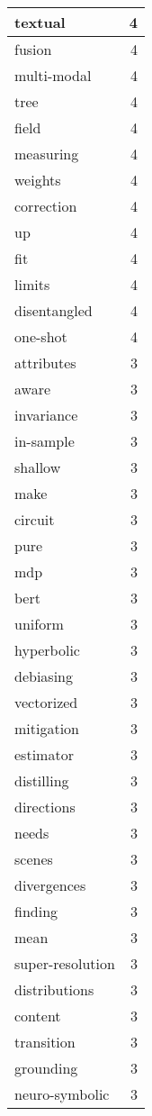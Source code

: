 \begin{table}[h]
\begin{tabular}{|l|r|}
\hline
textual & 4 \\
\hline
fusion & 4 \\
\hline
multi-modal & 4 \\
\hline
tree & 4 \\
\hline
field & 4 \\
\hline
measuring & 4 \\
\hline
weights & 4 \\
\hline
correction & 4 \\
\hline
up & 4 \\
\hline
fit & 4 \\
\hline
limits & 4 \\
\hline
disentangled & 4 \\
\hline
one-shot & 4 \\
\hline
attributes & 3 \\
\hline
aware & 3 \\
\hline
invariance & 3 \\
\hline
in-sample & 3 \\
\hline
shallow & 3 \\
\hline
make & 3 \\
\hline
circuit & 3 \\
\hline
pure & 3 \\
\hline
mdp & 3 \\
\hline
bert & 3 \\
\hline
uniform & 3 \\
\hline
hyperbolic & 3 \\
\hline
debiasing & 3 \\
\hline
vectorized & 3 \\
\hline
mitigation & 3 \\
\hline
estimator & 3 \\
\hline
distilling & 3 \\
\hline
directions & 3 \\
\hline
needs & 3 \\
\hline
scenes & 3 \\
\hline
divergences & 3 \\
\hline
finding & 3 \\
\hline
mean & 3 \\
\hline
super-resolution & 3 \\
\hline
distributions & 3 \\
\hline
content & 3 \\
\hline
transition & 3 \\
\hline
grounding & 3 \\
\hline
neuro-symbolic & 3 \\

\end{tabular}
\end{table}
